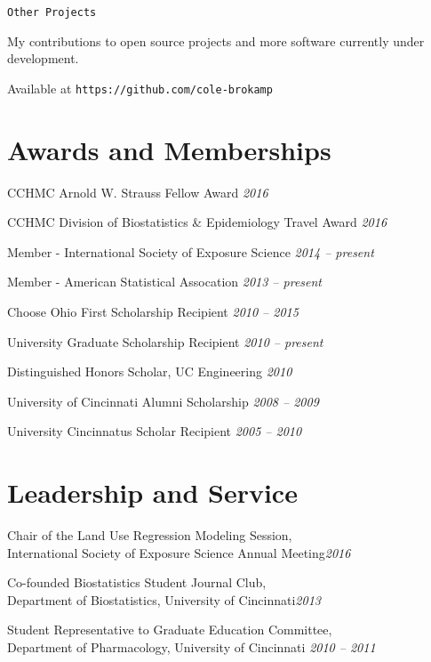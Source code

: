 \documentclass[margin,line]{res}
\newenvironment{list1}{
  \begin{list}{\ding{113}}{%
      \setlength{\itemsep}{0in}
      \setlength{\parsep}{0in} \setlength{\parskip}{0in}
      \setlength{\topsep}{0in} \setlength{\partopsep}{0in} 
      \setlength{\leftmargin}{0.17in}}}{\end{list}}
\newenvironment{list3}{
  \begin{list}{}{%
      \setlength{\itemsep}{0in}
      \setlength{\parsep}{0in} \setlength{\parskip}{0in}
      \setlength{\topsep}{0in} \setlength{\partopsep}{0in} 
      \setlength{\leftmargin}{0in}}}{\end{list}}
\begin{document}
\begin{resume}
\texttt{Other Projects}
\begin{list1} \itemsep 2pt
\item[] My contributions to open source projects and more software currently under development.
\item[] Available at \texttt{https://github.com/cole-brokamp}
\end{list1}

 

\section{\sc Awards and Memberships} 

\begin{list3} \itemsep 4pt   
\item[] CCHMC Arnold W. Strauss Fellow Award \hfill \textit{2016}
\item[] CCHMC Division of Biostatistics \& Epidemiology Travel Award \hfill \textit{2016}
\item[] Member - International Society of Exposure Science \hfill \textit{2014 -- present}
\item[] Member - American Statistical Assocation \hfill \textit{2013 -- present}
\item[] Choose Ohio First Scholarship Recipient \hfill \textit{2010 -- 2015}
\item[] University Graduate Scholarship Recipient \hfill \textit{2010 -- present}
\item[] Distinguished Honors Scholar, UC Engineering \hfill \textit{2010}
\item[] University of Cincinnati Alumni Scholarship \hfill \textit{2008 -- 2009}
\item[] University Cincinnatus Scholar Recipient \hfill \textit{2005 -- 2010}
\end{list3}


\section{\sc Leadership and Service} 
\begin{list3} \itemsep 4pt     
\item[] Chair of the Land Use Regression Modeling Session, \\International Society of Exposure Science Annual Meeting\hfill \textit{2016} 
\item[] Co-founded Biostatistics Student Journal Club, \\Department of Biostatistics, University of Cincinnati\hfill \textit{2013} 
\item[] Student Representative to Graduate Education Committee, \\Department of Pharmacology, University of Cincinnati \hfill \textit{2010 -- 2011}
\end{list3}


\end{resume}
\end{document}
